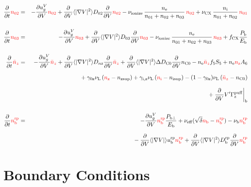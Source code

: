 \documentclass[11pt]{article}
\def\r#1{{\rm#1}}
\def\aves#1{\langle#1\rangle}
\def\dd#1#2{\frac{\partial #1}{\partial #2}}
\def\ddV{\frac{\partial}{\partial V}}
\def\ddt{\frac{\partial}{\partial t}}
\def\nee{n_\r{e}}
\def\ni{n_\r{i}}
\def\nz{n_\r{z}}
\def\nb{n_\r{b}}
\def\ugV{u_{g}^V}
\def\nsup#1{n_\r{#1sup}}
\def\nbrp{n_\r{b}^\r{rp}}
\def\ubrp{u_\r{b}^\r{rp}}
\def\Dbrp{D_\r{b}^\r{rp}}
\def\Pbperp{P_{\r{b}\perp}}
\def\Pb{P_\r{b}}
\def\Eb{E_\r{b}}
\def\nna{n_{01}}
\def\nnb{n_{02}}
\def\nnc{n_{03}}
\def\nnz{\bar{n}_{z}}
\def\nueff{\nu_\r{eff}}
\def\fCX{f_\r{CX}}
\def\nuL{\nu_\r{L}}
\def\nuCX{\nu_\r{CX}}
\def\nuion{\nu_\r{ionize}}
\def\nub{\nu_\r{b}}
\def\red#1{\textcolor{red}{#1}}
\begin{document}
\begin{eqnarray}
  \ddt \red{\nnb} &=& 
%
  - \dd{\ugV}{V} \red{\nnb}
%
  + \ddV \aves{|\nabla V|^2} D_{02} \ddV \red{\nnb}
%
  - \nuion\, \frac{\nee}{\nna + \nnb + \nnc}\, \red{\nnb}
%
  + \nuCX\, \frac{\ni}{\nna + \nnb}\, \red{\nna}
%
\\[5mm]
  \ddt \red{\nnc} &=& 
%
  - \dd{\ugV}{V} \red{\nnc}
%
  + \ddV \aves{|\nabla V|^2} D_{03} \ddV \red{\nnc}
%
  - \nuion\, \frac{\nee}{\nna + \nnb + \nnc}\, \red{\nnc}
%
  + \fCX \frac{\Pb}{\Eb}
\\[5mm]
  \ddt \red{\nnz} &=& 
%
  - \dd{\ugV}{V} \red{\nnz}
%
  + \ddV \aves{|\nabla V|^2} D_{n\r{z}} \ddV \red{\nnz}
%
  + \ddV \aves{|\nabla V|^2} \Delta D_{\r{C0}} \ddV n_\r{C0}
%
  - \nee \red{\nnz} f_5S_5 + \nee \red{\nz} A_6 
\nonumber\\[2.5mm]&&{}
%
  + \gamma_\r{0z} \nuL \, (\red{\nz} - \nsup{z})
%
  + \gamma_\r{i,z} \nuL \, (\red{\ni} - \nsup{i})
%
  - (1-\gamma_\r{0z}) \nuL \, (\red{\nnz} - n_\r{C0})
\nonumber\\[2.5mm]&&{}
%
  + \ddV V' \Gamma^\r{puff}_\r{z}\biggr|_\r{b}
\\[5mm]
  \ddt \red{\nbrp} &=&
%
  - \dd{\ugV}{V} \red{\nbrp}
%
    \frac{\Pbperp}{\Eb}
%
  + \nueff (\sqrt{\delta} \red{\nb} - \red{\nbrp})
%
  - \nub \red{\nbrp}
%
\nonumber\\[2.5mm]&&{}
  - \ddV \aves{|\nabla V|} \ubrp \red{\nbrp} 
  + \ddV \aves{|\nabla V|^2} \Dbrp \ddV \red{\nbrp}
\end{eqnarray}

\bigskip

\section{Boundary Conditions}
\end{document}
